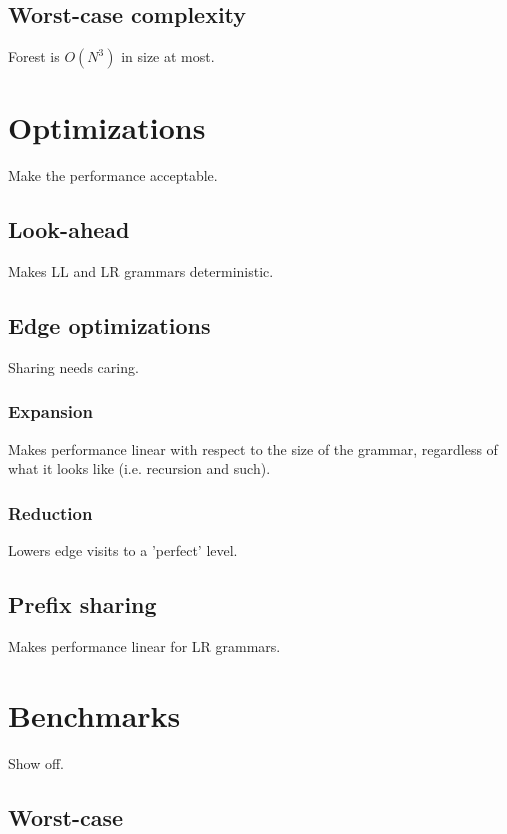 \documentclass[a4paper,10pt]{article}
\begin{document}
\subsection{Worst-case complexity}

Forest is $O(N^3)$ in size at most.

\section{Optimizations}

Make the performance acceptable.

\subsection{Look-ahead}

Makes LL and LR grammars deterministic.

\subsection{Edge optimizations}

Sharing needs caring.

\subsubsection{Expansion}

Makes performance linear with respect to the size of the grammar, regardless of what it looks like (i.e. recursion and such).

\subsubsection{Reduction}

Lowers edge visits to a 'perfect' level.

\subsection{Prefix sharing}

Makes performance linear for LR grammars.

\section{Benchmarks}

Show off.

\subsection{Worst-case}
\end{document}
